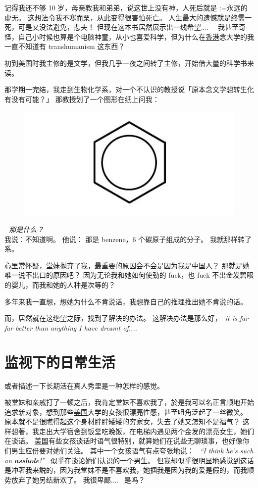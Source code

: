 \documentclass[12pt]{report}
\makeatletter
\newcommand{\tab}{\hspace*{1cm}}
\newcommand{\speechEn}[1]{\textrm{\textit{\ #1\ }}}
\newcommand{\speechCn}[1]{\textrm{\textit{\textcolor{Speech}{#1}}}}
\renewcommand{\d}[1]{$\underaccent{\scalebox{0.5}{\textbullet}}{\textrm{#1}}$}
\newcommand{\ds}[1]{%
  \@tfor\next:=#1\do{\d{\next}}}
\newcommand*\dashh{\,\,\textemdash\kern-1pt\textemdash\,\,}
\makeatother
\begin{document}
记得我还不够 10 岁，母亲教我和弟弟，说这世上没有神，人死后就是\ds{永远的虚无}。 这想法令我不寒而栗，从此变得很害怕死亡。 人生最大的遗憾就是终需一死，可是又没法避免，悲夫！  但现在这本书居然展示出一线希望....~~  我甚至奇怪，自己小时候也算是个电脑神童，从小也喜爱科学，但为什么在\uline{香港}念大学的我一直不知道有 transhumanism 这东西？

初到美国时我主修的是文学，但我几乎一夜之间转了主修，开始借大量的科学书来读。

那学期一完结，我走到生物化学系，对一个不认识的教授说「原本念文学想转生化有没有可能？」 那教授划了一个图形在纸上问我：
\begin{figure}[H]
\centering
\includegraphics[scale=0.4]{benzene.jpg}
\end{figure}
\vspace{-1cm}
\tab \dashh \speechCn{那是什么？}\\
我说：不知道啊。 他说： 那是 benzene，6 个碳原子组成的分子。  我就那样转了系。

心里常怀疑，堂妹抛弃了我，最重要的原因会不会是因为我是\uline{中国}人？ 那就是她唯一说不出口的原因吧？  因为无论我和她如何使劲的 fuck，也 fuck 不出金发碧眼的婴儿，而我和她的人种是次等的？

多年来我一直想，想她为什么不肯说话，我想靠自己的推理推出她不肯说的话。

而，居然就在这绝望之际，找到了解决的办法。 这解决办法是那么好，\speechEn{it is far far better than anything I have dreamt of....}

\chapter{监视下的日常生活}

或者描述一下长期活在真人秀里是一种怎样的感觉。 

被堂妹和亲戚打了一顿之后，我肯定堂妹不喜欢我了，於是我可以名正言顺地开始追求新对象，想到那些\uline{美国}大学的女孩很漂亮性感，甚至咀角泛起了一丝微笑。  原本就不是很瞧得起这个身材胖胖矮矮的穷家女，失去了她又怎知不是福气？  这样想著，我走出大学宿舍到饭堂吃晚饭，在电梯内遇见两个金发的漂亮女生，她们在谈话。 \uline{美国}有些女孩谈话时语气很特别，就算她们在说些无聊琐事，也好像你们男生应份要对她们关注。 其中一个女孩语气有点夸张地说： \speechEn{``I think he's such an \textbf{asshole}!''}  似乎在谈论她们认识的一个男生。  但我却似乎很明显地感觉到这话是冲著我来説的，因为我堂妹不是不喜欢我，她掴我是因为我的爱是假的，而我顺势放弃了她另结新欢了。 我很卑鄙....~ 是吗？
\end{document}
